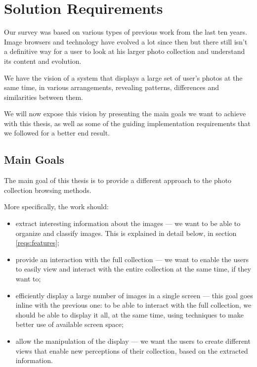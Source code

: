 \chapter{Solution Requirements} %
\label{chapter:solution_requirements}

Our survey was based on various types of previous work from the last ten years. Image browsers and technology have evolved a lot since then but there still isn't a definitive way for a user to look at his larger photo collection and understand its content and evolution.



We have the vision of a system that displays a large set of user’s photos at the same time, in various arrangements, revealing patterns, differences and similarities between them.

We will now expose this vision by presenting the main goals we want to achieve with this thesis, as well as some of the guiding implementation requirements that we followed for a better end result.





\section{Main Goals} %
\label{reqs:main_goal}

The main goal of this thesis is to provide a different approach to the photo collection browsing methods.

More specifically, the work should:

\begin{itemize}
	\item{extract interesting information about the images — we want to be able to organize and classify images. This is explained in detail below, in section \ref{reqs:features};}


	\item{provide an interaction with the full collection — we want to enable the users to easily view and interact with the entire collection at the same time, if they want to;}

	\item{efficiently display a large number of images in a single screen — this goal goes inline with the previous one: to be able to interact with the full collection, we should be able to display it all, at the same time, using techniques to make better use of available screen space;}

	\item{allow the manipulation of the display — we want the users to create different views that enable new perceptions of their collection, based on the extracted information.}
	
	

\end{itemize}

